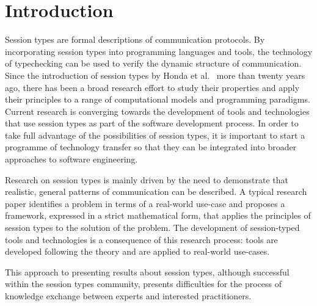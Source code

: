 
\section{Introduction}

Session types are formal descriptions of communication protocols.
By incorporating session types into programming languages and tools,
the technology of typechecking can be used to verify the dynamic
structure of communication.
Since the introduction of session types by Honda et al.\
\cite{honda.vasconcelos.kubo:language-primitives}
more than twenty years ago, there has been a broad research effort to study
their properties and apply their principles to a range of computational models
and programming paradigms.
Current research is converging towards the development of tools and technologies
that use session types as part of the software development process.
In order to take full advantage of the possibilities of session types,
it is important to start a programme of technology transfer so that they can
be integrated into broader approaches to software engineering.

Research on session types is mainly driven by the need to demonstrate that realistic,
general patterns of
communication can be described.
A typical research paper identifies a problem in terms of a real-world use-case and 
proposes a %
framework, expressed in a strict mathematical form, 
that applies the principles of session types to the solution of the problem.
The development of session-typed tools and technologies is a consequence of this
research process: tools are developed following the theory and are applied to real-world use-cases.

This approach to presenting results about session types,
although successful within the session types community,
presents difficulties for the process of knowledge exchange
between experts and interested practitioners.

